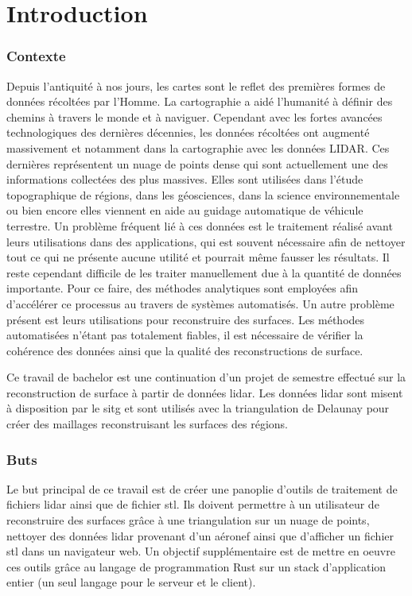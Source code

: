 \chapter*{Introduction}
\subsection*{Contexte}
Depuis l'antiquité à nos jours, les cartes sont le reflet des premières formes de données récoltées par l'Homme.
La cartographie a aidé l'humanité à définir des chemins à travers le monde et à naviguer.
Cependant avec les fortes avancées technologiques des dernières décennies,
les données récoltées ont augmenté massivement et notamment dans la cartographie avec les données LIDAR.
Ces dernières représentent un nuage de points dense qui sont actuellement une des informations collectées des plus massives.
Elles sont utilisées dans l'étude topographique de régions, dans les géosciences,
dans la science environnementale ou bien encore elles viennent en aide au guidage automatique de véhicule terrestre.
Un problème fréquent lié à ces données est le traitement réalisé avant leurs
utilisations dans des applications, qui est souvent nécessaire afin de nettoyer
tout ce qui ne présente aucune utilité et pourrait même fausser les résultats.
Il reste cependant difficile de les traiter manuellement due à la quantité de données importante.
Pour ce faire, des méthodes analytiques sont employées afin d'accélérer ce processus au travers de systèmes automatisés.
Un autre problème présent est leurs utilisations pour reconstruire des surfaces.
Les méthodes automatisées n'étant pas totalement fiables, il est nécessaire de
vérifier la cohérence des données ainsi que la qualité des reconstructions de
surface.

Ce travail de bachelor est une continuation d'un projet de semestre effectué sur
la reconstruction de surface à partir de données lidar. Les données lidar sont misent à disposition par le \gls{sitg} et sont utilisés
avec la triangulation de Delaunay pour créer des maillages reconstruisant les
surfaces des régions.

\subsection*{Buts}
Le but principal de ce travail est de créer une panoplie d'outils de traitement
de fichiers lidar ainsi que de fichier stl. Ils doivent permettre à un
utilisateur de reconstruire des surfaces grâce à une triangulation sur un nuage
de points, nettoyer des données lidar provenant d'un aéronef ainsi que
d'afficher un fichier stl dans un navigateur web. Un objectif supplémentaire est
de mettre en oeuvre ces outils grâce au langage de programmation Rust sur un
stack d'application entier (un seul langage pour le serveur et le client).

